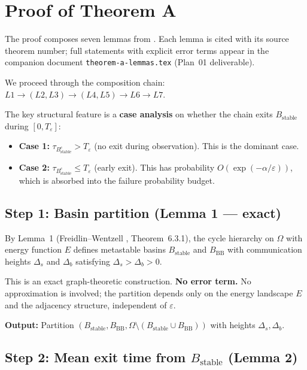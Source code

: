\documentclass[11pt]{article}
\newcommand{\eps}{\varepsilon}
\newcommand{\Ds}{\Delta_s}
\newcommand{\Db}{\Delta_b}
\newcommand{\Bstable}{B_{\mathrm{stable}}}
\newcommand{\BBB}{B_{\mathrm{BB}}}
\newcommand{\Teps}{T_\eps}
\begin{document}
\section{Proof of Theorem A}
\label{sec:proof}

The proof composes seven lemmas from \cite{FW12, BEGK02, BdH15, CV16}.
Each lemma is cited with its source theorem number; full statements
with explicit error terms appear in the companion document
\texttt{theorem-a-lemmas.tex} (Plan~01 deliverable).

We proceed through the composition chain:
$L1 \to (L2, L3) \to (L4, L5) \to L6 \to L7$.

The key structural feature is a \textbf{case analysis} on whether
the chain exits $\Bstable$ during $[0, \Teps]$:
\begin{itemize}
\item \textbf{Case 1:} $\tau_{\Bstable^c} > \Teps$
  (no exit during observation). This is the dominant case.
\item \textbf{Case 2:} $\tau_{\Bstable^c} \leq \Teps$
  (early exit). This has probability $O(\exp(-\alpha/\eps))$,
  which is absorbed into the failure probability budget.
\end{itemize}

\subsection*{Step 1: Basin partition (Lemma 1 --- exact)}

By Lemma~1 (Freidlin--Wentzell \cite{FW12}, Theorem~6.3.1),
the cycle hierarchy on $\Omega$ with energy function $E$ defines
metastable basins $\Bstable$ and $\BBB$ with communication heights
$\Ds$ and $\Db$ satisfying $\Ds > \Db > 0$.

This is an exact graph-theoretic construction.
\textbf{No error term.}
No approximation is involved; the partition depends only on the
energy landscape $E$ and the adjacency structure, independent of $\eps$.

\textbf{Output:} Partition $(\Bstable, \BBB,
\Omega \setminus (\Bstable \cup \BBB))$ with heights $\Ds, \Db$.

\subsection*{Step 2: Mean exit time from $\Bstable$ (Lemma 2)}
\end{document}
